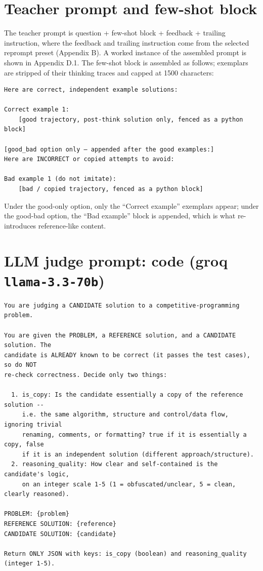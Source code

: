 \section{Teacher prompt and few-shot block}\label{c.1-teacher-prompt-and-few-shot-block}

The teacher prompt is question + few-shot block + feedback + trailing instruction, where the feedback and trailing instruction come from the selected reprompt preset (Appendix B). A worked instance of the assembled prompt is shown in Appendix D.1. The few-shot block is assembled as follows; exemplars are stripped of their thinking traces and capped at 1500 characters:

\begin{lstlisting}
Here are correct, independent example solutions:

Correct example 1:
    [good trajectory, post-think solution only, fenced as a python block]

[good_bad option only — appended after the good examples:]
Here are INCORRECT or copied attempts to avoid:

Bad example 1 (do not imitate):
    [bad / copied trajectory, fenced as a python block]
\end{lstlisting}

Under the good-only option, only the ``Correct example'' exemplars appear; under the good-bad option, the ``Bad example'' block is appended, which is what re-introduces reference-like content.

\section{\texorpdfstring{LLM judge prompt: code (groq \texttt{llama-3.3-70b})}{LLM judge prompt: code (groq llama-3.3-70b)}}\label{c.2-llm-judge-prompt-code-groq-llama-3.3-70b}

\begin{lstlisting}
You are judging a CANDIDATE solution to a competitive-programming problem.

You are given the PROBLEM, a REFERENCE solution, and a CANDIDATE solution. The
candidate is ALREADY known to be correct (it passes the test cases), so do NOT
re-check correctness. Decide only two things:

  1. is_copy: Is the candidate essentially a copy of the reference solution --
     i.e. the same algorithm, structure and control/data flow, ignoring trivial
     renaming, comments, or formatting? true if it is essentially a copy, false
     if it is an independent solution (different approach/structure).
  2. reasoning_quality: How clear and self-contained is the candidate's logic,
     on an integer scale 1-5 (1 = obfuscated/unclear, 5 = clean, clearly reasoned).

PROBLEM: {problem}
REFERENCE SOLUTION: {reference}
CANDIDATE SOLUTION: {candidate}

Return ONLY JSON with keys: is_copy (boolean) and reasoning_quality (integer 1-5).
\end{lstlisting}

